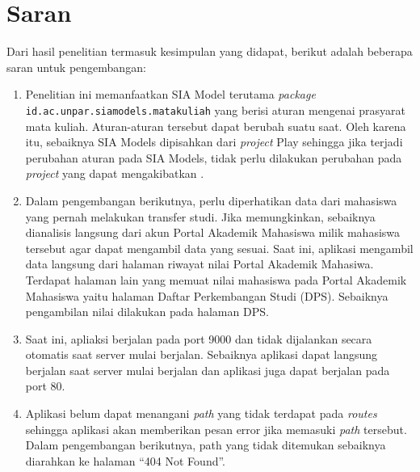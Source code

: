 \section{Saran}
\label{sec:saran}
Dari hasil penelitian termasuk kesimpulan yang didapat, berikut adalah beberapa saran untuk pengembangan:
	\begin{enumerate}
		\item Penelitian ini memanfaatkan SIA Model terutama \textit{package} \texttt{id.ac.unpar.siamodels.matakuliah} yang berisi aturan mengenai prasyarat mata kuliah. Aturan-aturan tersebut dapat berubah suatu saat. Oleh karena itu, sebaiknya SIA Models dipisahkan dari \textit{project} Play sehingga jika terjadi perubahan aturan pada SIA Models, tidak perlu dilakukan perubahan pada \textit{project} yang dapat mengakibatkan . 
		\item Dalam pengembangan berikutnya, perlu diperhatikan data dari mahasiswa yang pernah melakukan transfer studi. Jika memungkinkan, sebaiknya dianalisis langsung dari akun Portal Akademik Mahasiswa milik mahasiswa tersebut agar dapat mengambil data yang sesuai. Saat ini, aplikasi mengambil data langsung dari halaman riwayat nilai Portal Akademik Mahasiwa. Terdapat halaman lain yang memuat nilai mahasiswa pada Portal Akademik Mahasiswa yaitu halaman Daftar Perkembangan Studi (DPS). Sebaiknya pengambilan nilai dilakukan pada halaman DPS.
		\item Saat ini, apliaksi berjalan pada port 9000 dan tidak dijalankan secara otomatis saat server mulai berjalan. Sebaiknya aplikasi dapat langsung berjalan saat server mulai berjalan dan aplikasi juga dapat berjalan pada port 80.
		\item Aplikasi belum dapat menangani \textit{path} yang tidak terdapat pada \textit{routes} sehingga aplikasi akan memberikan pesan error jika memasuki \textit{path} tersebut. Dalam pengembangan berikutnya, path yang tidak ditemukan sebaiknya diarahkan ke halaman ``404 Not Found''.
	\end{enumerate}